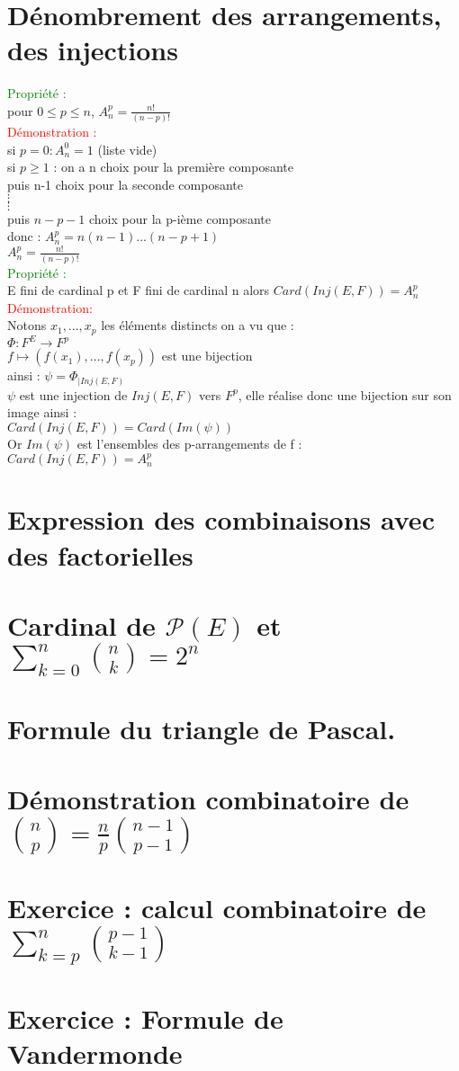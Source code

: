 \documentclass{article}
\begin{document}
\section{Dénombrement des arrangements, des injections}
\textcolor{green}{Propriété : } \\
pour $0 \leq p \leq n $, $A_n^p=\frac{n!}{(n-p)!}$ \\
\textcolor{red}{Démonstration :} \\
si $p=0: A_n^0=1$ (liste vide) \\
si $p \geq 1$ : on a n choix pour la première composante \\
puis n-1 choix pour la seconde composante \\
$\vdots$ \\
$\vdots$ \\
puis $n-p-1$ choix pour la p-ième composante \\
donc : $A_n^p=n(n-1)...(n-p+1)$ \\
$A_n^p=\frac{n!}{(n-p)!}$ \\
\textcolor{green}{Propriété :} \\
E fini de cardinal p et F fini de cardinal n alors $Card(Inj(E,F))=A_n^p$ \\
\textcolor{red}{Démonstration: } \\
Notons $x_1,...,x_p$ les éléments distincts on a vu que : \\
$\Phi : F^E \rightarrow F^p$ \\
$f \mapsto (f(x_1),...,f(x_p))$ est une bijection \\
ainsi : $\psi=\Phi_{|Inj(E,F)} $ \\
$\psi$ est une injection de $Inj(E,F)$ vers $F^p$, elle réalise donc une bijection sur son image ainsi : \\
$Card(Inj(E,F))=Card(Im(\psi))$ \\
Or $Im(\psi)$ est l'ensembles des p-arrangements de f : \\
$Card(Inj(E,F))=A_n^p$ 
\section{Expression des combinaisons avec des factorielles}
\section{Cardinal de $\mathcal P (E)$ et $\sum_{k=0}^n \binom{n}{k}=2^n$ }
\section{Formule du triangle de Pascal.}
\section{Démonstration combinatoire de $\binom{n}{p}= \frac n p \binom{n-1}{p-1}$}
\section{Exercice : calcul combinatoire de $\sum_{k=p}^n \binom{p-1}{k-1} $ }
\section{ Exercice : Formule de Vandermonde}
\end{document}
